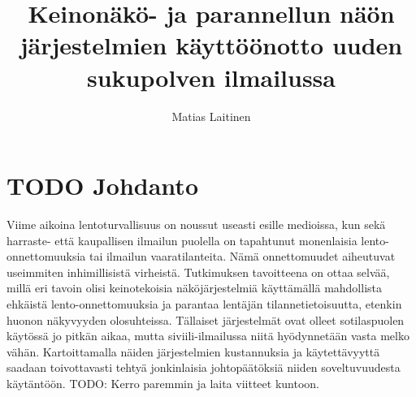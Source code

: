 \documentclass[utf8,bachelor,manualbib]{gradu3}
\begin{document}
\title{Keinonäkö- ja parannellun näön järjestelmien käyttöönotto uuden sukupolven ilmailussa}



\author{Matias Laitinen}

\maketitle
  
\mainmatter

\chapter{TODO Johdanto}

Viime aikoina lentoturvallisuus on noussut useasti esille medioissa, kun sekä harraste- että kaupallisen ilmailun puolella on tapahtunut monenlaisia lento-onnettomuuksia tai ilmailun vaaratilanteita. Nämä onnettomuudet aiheutuvat useimmiten inhimillisistä virheistä. Tutkimuksen tavoitteena on ottaa selvää, millä eri tavoin olisi keinotekoisia näköjärjestelmiä käyttämällä mahdollista ehkäistä lento-onnettomuuksia ja parantaa lentäjän tilannetietoisuutta, etenkin huonon näkyvyyden olosuhteissa. Tällaiset järjestelmät ovat olleet sotilaspuolen käytössä jo pitkän aikaa, mutta siviili-ilmailussa niitä hyödynnetään vasta melko vähän. Kartoittamalla näiden järjestelmien kustannuksia ja käytettävyyttä saadaan toivottavasti tehtyä jonkinlaisia johtopäätöksiä niiden soveltuvuudesta käytäntöön. TODO: Kerro paremmin ja laita viitteet kuntoon.
\end{document}
